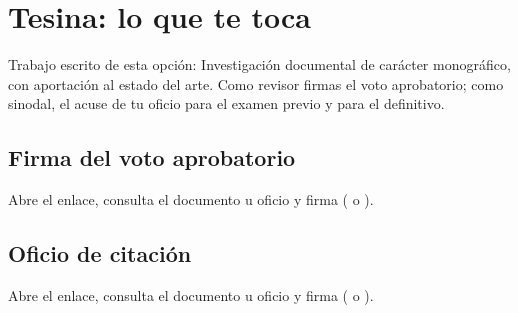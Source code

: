 \section{Tesina: lo que te toca}
Trabajo escrito de esta opción: Investigación documental de carácter monográfico, con aportación al estado del arte. Como revisor firmas el voto aprobatorio; como sinodal, el acuse de tu oficio para el examen previo y para el definitivo.
\subsection{Firma del voto aprobatorio}
Abre el enlace, consulta el documento u oficio y firma ( o ).
\subsection{Oficio de citación}
Abre el enlace, consulta el documento u oficio y firma ( o ).

